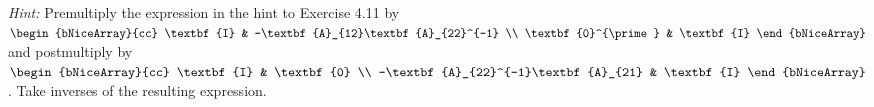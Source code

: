 \newline
\textit{Hint:} Premultiply the expression in the hint to Exercise 4.11 by
$
\begin{bNiceArray}{cc}
    \textbf{I} & -\textbf{A}_{12}\textbf{A}_{22}^{-1} \\
    \textbf{0}^{\prime} & \textbf{I}
\end{bNiceArray}
$
 and postmultiply by 
 $
 \begin{bNiceArray}{cc}
    \textbf{I} & \textbf{0} \\
    -\textbf{A}_{22}^{-1}\textbf{A}_{21} & \textbf{I}
 \end{bNiceArray}
 $
. Take inverses of the resulting expression.